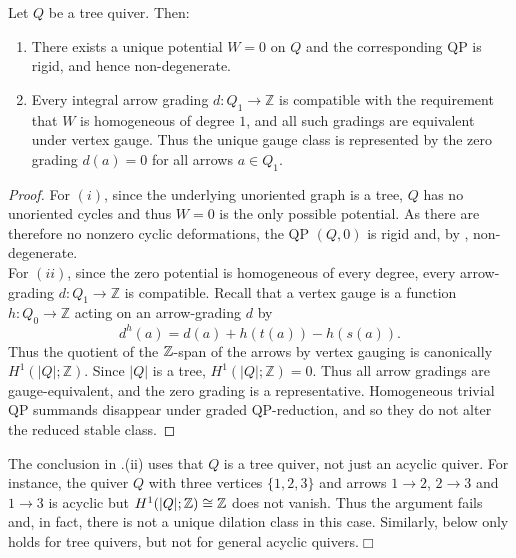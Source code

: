 \begin{lemma}\label{lem:unique-tree-qp}
Let $Q$ be a tree quiver. Then:
\begin{enumerate}[label=\textup{(\roman*)}]
\item There exists a unique potential $W=0$ on $Q$ and the corresponding QP is rigid, and hence non-degenerate.\\

\item Every integral arrow grading $d\colon Q_1\to\mathbb Z$ is compatible with the requirement that $W$ is homogeneous of degree $1$, and all such gradings are equivalent under vertex gauge. Thus the unique gauge class is represented by the zero grading $d(a)=0$ for all arrows $a\in Q_1$. 
\end{enumerate}
\end{lemma}

\begin{proof}
For $(i)$, since the underlying unoriented graph is a tree, $Q$ has no unoriented cycles and thus $W=0$ is the only possible potential. As there are therefore no nonzero cyclic deformations, the QP $(Q,0)$ is rigid and, by \cite[Corollary~8.2]{DWZ}, non-degenerate.\\

\noindent For $(ii)$, since the zero potential is homogeneous of every degree, every arrow-grading $d\colon Q_1\to\mathbb Z$ is compatible. Recall that a vertex gauge is a function $h\colon Q_0\to\mathbb Z$ acting on an arrow-grading $d$ by
\[
 d^{h}(a)=d(a)+h(t(a))-h(s(a)).
\]
Thus the quotient of the $\mathbb Z$-span of the arrows by vertex gauging is canonically $H^1(|Q|;\mathbb Z)$. Since $|Q|$ is a tree, $H^1(|Q|;\mathbb Z)=0$.  Thus all arrow gradings are gauge-equivalent, and the zero grading is a representative.  Homogeneous trivial QP summands disappear under graded QP-reduction, and so they do not alter the reduced stable class.
\end{proof}

\begin{remark}
The conclusion in .(ii) uses that $Q$ is a tree quiver, not just an acyclic quiver. For instance, the quiver $Q$ with three vertices $\{1,2,3\}$ and arrows $1\to2$, $2\to3$ and $1\to3$ is acyclic but $H^1(|Q|;\mathbb Z)\cong\mathbb Z$ does not vanish. Thus the argument fails and, in fact, there is not a unique dilation class in this case. Similarly,  below only holds for tree quivers, but not for general acyclic quivers.\hfill$\Box$
\end{remark}

